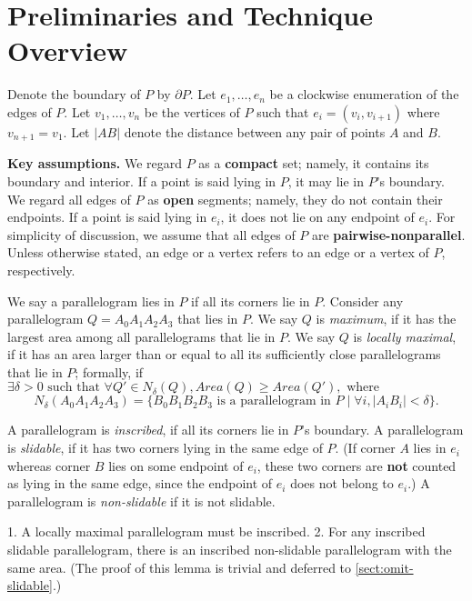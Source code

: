 \documentclass{ws-ijcga}
\begin{document}
\section{Preliminaries and Technique Overview}\label{sect:preliminiary}

Denote the boundary of $P$ by $\partial P$.
Let $e_1,\ldots,e_n$ be a clockwise enumeration of the edges of $P$.
Let $v_1,\ldots,v_n$ be the vertices of $P$ such that $e_i=(v_i,v_{i+1})$ where $v_{n+1}=v_1$.
Let $|AB|$ denote the distance between any pair of points $A$ and $B$.

\medskip \noindent\textbf{Key assumptions.}
We regard $P$ as a \textbf{compact} set; namely, it contains its boundary and interior.
If a point is said lying in $P$, it may lie in $P$'s boundary.
We regard all edges of $P$ as \textbf{open} segments; namely, they do not contain their endpoints.
If a point is said lying in $e_i$, it does not lie on any endpoint of $e_i$.
For simplicity of discussion, we assume that all edges of $P$ are \textbf{pairwise-nonparallel}.
Unless otherwise stated, an edge or a vertex refers to an edge or a vertex of $P$, respectively.

\begin{definition}\label{def:locallymaximal}
We say a parallelogram lies in $P$ if all its corners lie in $P$.
Consider any parallelogram $Q=A_0A_1A_2A_3$ that lies in $P$.
We say $Q$ is \emph{maximum}, if it has the largest area among all parallelograms that lie in $P$.
We say $Q$ is \emph{locally maximal}, if it has an area larger than or equal to all its sufficiently close parallelograms that lie in $P$;
formally, if $\exists \delta>0 \text{ such that }\forall Q'\in N_\delta(Q), Area(Q)\geq Area(Q'), \text{ where}$
\[N_\delta(A_0A_1A_2A_3)=\{B_0B_1B_2B_3\text{ is a parallelogram in }P\mid \forall i, |A_iB_i|<\delta\}.\]
\end{definition}

\begin{definition}
A parallelogram is \emph{inscribed}, if all its corners lie in $P$'s boundary.
A parallelogram is \emph{slidable}, if it has two corners lying in the same edge of $P$.
(If corner $A$ lies in $e_i$ whereas corner $B$ lies on some endpoint of $e_i$,
  these two corners are \textbf{not} counted as lying in the same edge, since the endpoint of $e_i$ does not belong to $e_i$.)
A parallelogram is \emph{non-slidable} if it is not slidable.
\end{definition}

\begin{lemma}\label{lemma:local-maximal-non-slidable}
1. A locally maximal parallelogram must be inscribed.
2. For any inscribed slidable parallelogram, there is an inscribed non-slidable parallelogram with the same area.
(The proof of this lemma is trivial and deferred to \ref{sect:omit-slidable}.)
\end{lemma}
\end{document}
